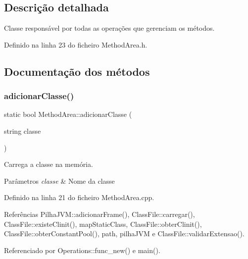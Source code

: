 \subsection{Descrição detalhada}
Classe responsável por todas as operações que gerenciam os métodos. 

Definido na linha 23 do ficheiro Method\+Area.\+h.



\subsection{Documentação dos métodos}
\mbox{\label{classMethodArea_a30233142aefa26c17a3a222582cb56c1}} 
\subsubsection{\texorpdfstring{adicionar\+Classe()}{adicionarClasse()}\hspace{0.1cm}{\footnotesize\ttfamily [1/2]}}
{\footnotesize\ttfamily static bool Method\+Area\+::adicionar\+Classe (\begin{DoxyParamCaption}\item[{string}]{classe }\end{DoxyParamCaption})\hspace{0.3cm}{\ttfamily [static]}}



Carrega a classe na memória. 


\begin{DoxyParams}{Parâmetros}
{\em classe} & Nome da classe \\
\hline
\end{DoxyParams}


Definido na linha 21 do ficheiro Method\+Area.\+cpp.



Referências Pilha\+J\+V\+M\+::adicionar\+Frame(), Class\+File\+::carregar(), Class\+File\+::existe\+Clinit(), map\+Static\+Class, Class\+File\+::obter\+Clinit(), Class\+File\+::obter\+Constant\+Pool(), path, pilha\+J\+VM e Class\+File\+::validar\+Extensao().



Referenciado por Operations\+::func\+\_\+new() e main().

